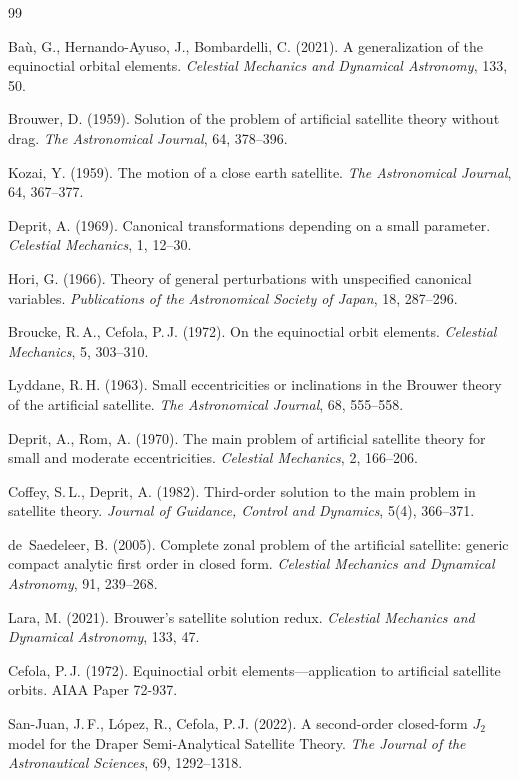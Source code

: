 \documentclass[11pt]{article}
\begin{document}
\begin{thebibliography}{99}

Ba\`u, G., Hernando-Ayuso, J., Bombardelli, C. (2021).
A generalization of the equinoctial orbital elements.
\textit{Celestial Mechanics and Dynamical Astronomy}, 133, 50.

Brouwer, D. (1959).
Solution of the problem of artificial satellite theory without drag.
\textit{The Astronomical Journal}, 64, 378--396.

Kozai, Y. (1959).
The motion of a close earth satellite.
\textit{The Astronomical Journal}, 64, 367--377.

Deprit, A. (1969).
Canonical transformations depending on a small parameter.
\textit{Celestial Mechanics}, 1, 12--30.

Hori, G. (1966).
Theory of general perturbations with unspecified canonical variables.
\textit{Publications of the Astronomical Society of Japan}, 18, 287--296.

Broucke, R.\,A., Cefola, P.\,J. (1972).
On the equinoctial orbit elements.
\textit{Celestial Mechanics}, 5, 303--310.

Lyddane, R.\,H. (1963).
Small eccentricities or inclinations in the Brouwer theory
of the artificial satellite.
\textit{The Astronomical Journal}, 68, 555--558.

Deprit, A., Rom, A. (1970).
The main problem of artificial satellite theory for small and moderate
eccentricities.
\textit{Celestial Mechanics}, 2, 166--206.

Coffey, S.\,L., Deprit, A. (1982).
Third-order solution to the main problem in satellite theory.
\textit{Journal of Guidance, Control and Dynamics}, 5(4), 366--371.

de~Saedeleer, B. (2005).
Complete zonal problem of the artificial satellite: generic compact
analytic first order in closed form.
\textit{Celestial Mechanics and Dynamical Astronomy}, 91, 239--268.

Lara, M. (2021).
Brouwer's satellite solution redux.
\textit{Celestial Mechanics and Dynamical Astronomy}, 133, 47.

Cefola, P.\,J. (1972).
Equinoctial orbit elements---application to artificial satellite orbits.
AIAA Paper 72-937.

San-Juan, J.\,F., L\'opez, R., Cefola, P.\,J. (2022).
A second-order closed-form $J_2$ model for the Draper
Semi-Analytical Satellite Theory.
\textit{The Journal of the Astronautical Sciences}, 69, 1292--1318.


\end{thebibliography}
\end{document}
